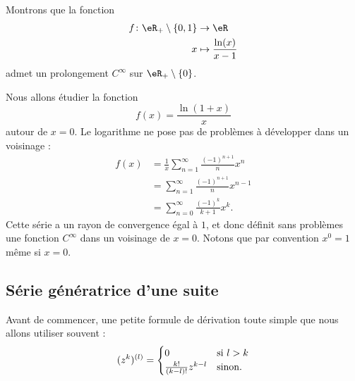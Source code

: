\begin{example}
    Montrons que la fonction
    \begin{equation}
        \begin{aligned}
            f\colon \eR_+\setminus\{ 0,1 \}&\to \eR \\
            x&\mapsto \frac{ \ln(x) }{ x-1 } 
        \end{aligned}
    \end{equation}
    admet un prolongement \( C^{\infty}\) sur \( \eR_+\setminus\{ 0 \}\).

    Nous allons étudier la fonction
    \begin{equation}
        f(x)=\frac{ \ln(1+x) }{ x }
    \end{equation}
    autour de \( x=0\). Le logarithme ne pose pas de problèmes à développer dans un voisinage :
    \begin{subequations}
        \begin{align}
            f(x)&=\frac{1}{ x }\sum_{n=1}^{\infty}\frac{ (-1)^{n+1} }{ n }x^n\\
            &=\sum_{n=1}^{\infty}\frac{ (-1)^{n+1} }{ n }x^{n-1}\\
            &=\sum_{n=0}^{\infty}\frac{ (-1)^k }{ k+1 }x^k.
        \end{align}
    \end{subequations}
    Cette série a un rayon de convergence égal à \( 1\), et donc définit sans problèmes une fonction \( C^{\infty}\) dans un voisinage de \( x=0\). Notons que par convention \( x^0=1\) même si \( x=0\).
\end{example}

\subsection{Série génératrice d'une suite}

Avant de commencer, une petite formule de dérivation toute simple que nous allons utiliser souvent :
\begin{equation}        \label{EqSOFdwhw}
    (z^k)^{(l)}=\begin{cases}
        0   &   \text{si \( l>k\)}\\
        \frac{ k! }{ (k-l)! }z^{k-l}    &    \text{sinon.}
    \end{cases}
\end{equation}

